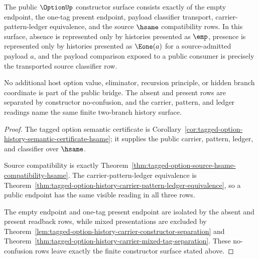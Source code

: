 \begin{theorem}
\label{thm:option-standard-bridge-finite-constructor-surface}
The public $\OptionUp$ constructor surface consists exactly of the empty
endpoint, the one-tag present endpoint, payload classifier transport,
carrier-pattern-ledger equivalence, and the source $\hsame$ compatibility rows.
In this surface, absence is represented only by histories presented as $\emp$,
presence is represented only by histories presented as $\Eone(a)$ for a
source-admitted payload $a$, and the payload comparison exposed to a public
consumer is precisely the transported source classifier row.

No additional host option value, eliminator, recursion principle, or hidden
branch coordinate is part of the public bridge. The absent and present rows are
separated by constructor no-confusion, and the carrier, pattern, and ledger
readings name the same finite two-branch history surface.
\end{theorem}
\begin{proof}
The tagged option semantic certificate is
Corollary~\ref{cor:tagged-option-history-semantic-certificate-hsame}; it supplies
the public carrier, pattern, ledger, and classifier over $\hsame$.

Source compatibility is exactly
Theorem~\ref{thm:tagged-option-source-hsame-compatibility-hsame}. The
carrier-pattern-ledger equivalence is
Theorem~\ref{thm:tagged-option-history-carrier-pattern-ledger-equivalence}, so a
public endpoint has the same visible reading in all three rows.

The empty endpoint and one-tag present endpoint are isolated by the absent and
present readback rows, while mixed presentations are excluded by
Theorem~\ref{lem:tagged-option-history-carrier-constructor-separation} and
Theorem~\ref{thm:tagged-option-history-carrier-mixed-tag-separation}. These
no-confusion rows leave exactly the finite constructor surface stated above.
\end{proof}


